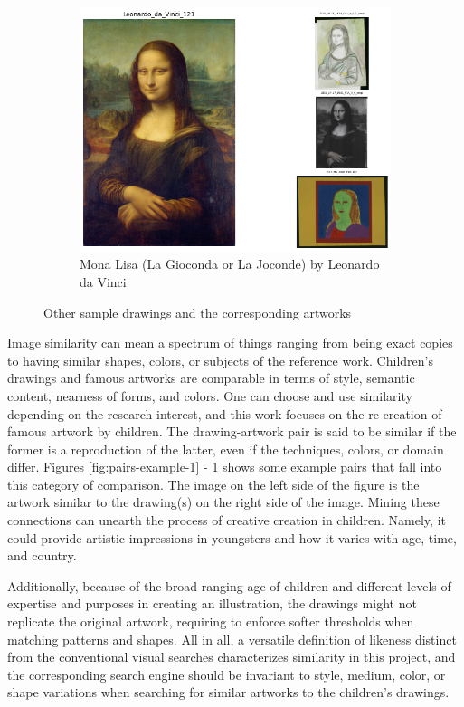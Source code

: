 \begin{figure}
\begin{subfigure}[b]{0.45\textwidth}
         \includegraphics[width=\textwidth]{images/example_pairs/Leonardo_da_Vinci_121.png}
         \caption{Mona Lisa (La Gioconda or La Joconde) by Leonardo da Vinci}
     \end{subfigure}
    \caption{Other sample drawings and the corresponding artworks}
    \label{fig:pairs-example-3}
\end{figure}


Image similarity can mean a spectrum of things ranging from being exact copies to having similar shapes, colors, or subjects of the reference work. Children's drawings and famous artworks are comparable in terms of style, semantic content, nearness of forms, and colors. One can choose and use similarity depending on the research interest, and this work focuses on the re-creation of famous artwork by children. The drawing-artwork pair is said to be similar if the former is a reproduction of the latter, even if the techniques, colors, or domain differ. Figures \ref{fig:pairs-example-1} - \ref{fig:pairs-example-3} shows some example pairs that fall into this category of comparison. The image on the left side of the figure is the artwork similar to the drawing(s) on the right side of the image. Mining these connections can unearth the process of creative creation in children. Namely, it could provide artistic impressions in youngsters and how it varies with age, time, and country.


Additionally, because of the broad-ranging age of children and different levels of expertise and purposes in creating an illustration, the drawings might not replicate the original artwork, requiring to enforce softer thresholds when matching patterns and shapes. All in all, a versatile definition of likeness distinct from the conventional visual searches characterizes similarity in this project, and the corresponding search engine should be invariant to style, medium, color, or shape variations when searching for similar artworks to the children's drawings.

